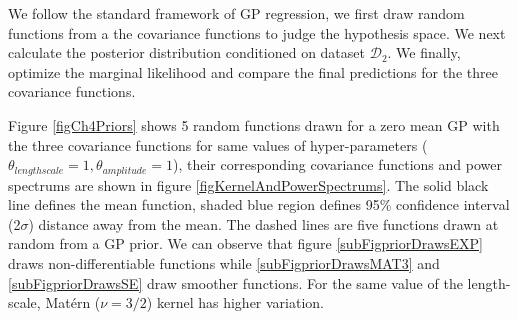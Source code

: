 We follow the standard framework of GP regression, we first draw random functions from a the covariance functions to judge the hypothesis space. We next calculate the posterior distribution conditioned on dataset $\mathcal{D}_{2}$. We finally, optimize the marginal likelihood and compare the final predictions for the three covariance functions. 

Figure \ref{figCh4Priors} shows 5 random functions drawn for a zero mean GP with the three covariance functions for same values of hyper-parameters ($\theta_{lengthscale} = 1, \theta_{amplitude} = 1$), their corresponding covariance functions and power spectrums are shown in figure \ref{figKernelAndPowerSpectrums}. The solid black line defines the mean function, shaded blue region defines 95\% confidence interval (2$\sigma$) distance away from the mean. The dashed lines are five functions drawn at random from a GP prior. We can observe that figure \ref{subFigpriorDrawsEXP} draws non-differentiable functions while \ref{subFigpriorDrawsMAT3} and \ref{subFigpriorDrawsSE} draw smoother functions. For the same value of the length-scale, Mat\'ern ($\nu=3/2$) kernel has higher variation.

